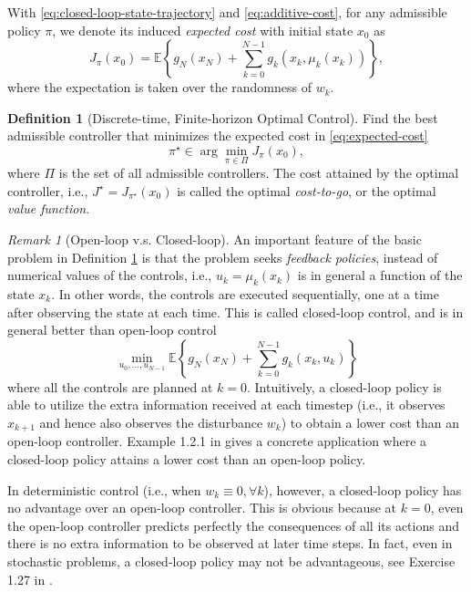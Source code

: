 \documentclass[
]{book}
\theoremstyle{definition}
\newtheorem{definition}{Definition}[chapter]
\theoremstyle{definition}
\theoremstyle{definition}
\theoremstyle{definition}
\theoremstyle{remark}
\newtheorem*{remark}{Remark}
\begin{document}
With \eqref{eq:closed-loop-state-trajectory} and \eqref{eq:additive-cost}, for any admissible policy \(\pi\), we denote its induced \emph{expected cost} with initial state \(x_0\) as
\begin{equation}
J_\pi (x_0) = \mathbb{E} \left\{ g_N(x_N) + \sum_{k=0}^{N-1} g_k (x_k, \mu_k(x_k))  \right\},
\label{eq:expected-cost}
\end{equation}
where the expectation is taken over the randomness of \(w_k\).

\begin{definition}[Discrete-time, Finite-horizon Optimal Control]
\protect\hypertarget{def:basicproblem}{}\label{def:basicproblem}Find the best admissible controller that minimizes the expected cost in \eqref{eq:expected-cost}
\begin{equation}
\pi^\star \in \arg\min_{\pi \in \Pi} J_\pi(x_0),
\end{equation}
where \(\Pi\) is the set of all admissible controllers.
The cost attained by the optimal controller, i.e., \(J^\star = J_{\pi^\star}(x_0)\) is called the optimal \emph{cost-to-go}, or the optimal \emph{value function}.
\end{definition}

\begin{remark}[Open-loop v.s. Closed-loop]
An important feature of the basic problem in Definition \ref{def:basicproblem} is that the problem seeks \emph{feedback policies}, instead of numerical values of the controls, i.e., \(u_k = \mu_k(x_k)\) is in general a function of the state \(x_k\). In other words, the controls are executed sequentially, one at a time after observing the state at each time. This is called closed-loop control, and is in general better than open-loop control
\[
\min_{u_0,\dots,u_{N-1}} \mathbb{E} \left\{ g_N(x_N) + \sum_{k=0}^{N-1} g_k (x_k, u_k)  \right\}
\]
where all the controls are planned at \(k=0\). Intuitively, a closed-loop policy is able to utilize the extra information received at each timestep (i.e., it observes \(x_{k+1}\) and hence also observes the disturbance \(w_k\)) to obtain a lower cost than an open-loop controller. Example 1.2.1 in \citep{bertsekas12book-dpocI} gives a concrete application where a closed-loop policy attains a lower cost than an open-loop policy.

In deterministic control (i.e., when \(w_k \equiv 0,\forall k\)), however, a closed-loop policy has no advantage over an open-loop controller. This is obvious because at \(k=0\), even the open-loop controller predicts perfectly the consequences of all its actions and there is no extra information to be observed at later time steps. In fact, even in stochastic problems, a closed-loop policy may not be advantageous, see Exercise 1.27 in \citep{bertsekas12book-dpocI}.
\end{remark}
\end{document}
